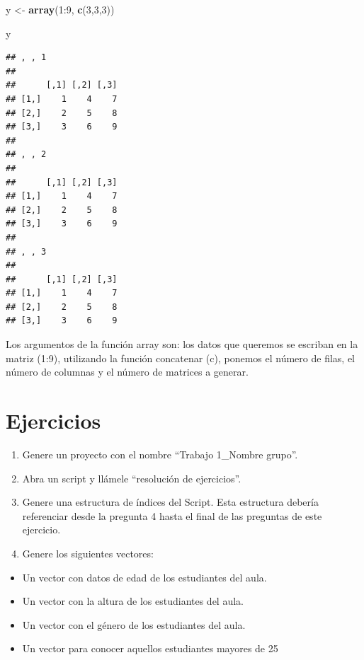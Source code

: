 \documentclass[]{article}
\newenvironment{Shaded}{\begin{snugshade}}{\end{snugshade}}
\newcommand{\KeywordTok}[1]{\textcolor[rgb]{0.13,0.29,0.53}{\textbf{{#1}}}}
\newcommand{\DecValTok}[1]{\textcolor[rgb]{0.00,0.00,0.81}{{#1}}}
\newcommand{\StringTok}[1]{\textcolor[rgb]{0.31,0.60,0.02}{{#1}}}
\newcommand{\NormalTok}[1]{{#1}}
\providecommand{\tightlist}{%
  \setlength{\itemsep}{0pt}\setlength{\parskip}{0pt}}
\begin{document}
\begin{Shaded}
\begin{Highlighting}[]
\NormalTok{y <-}\StringTok{ }\KeywordTok{array}\NormalTok{(}\DecValTok{1}\NormalTok{:}\DecValTok{9}\NormalTok{, }\KeywordTok{c}\NormalTok{(}\DecValTok{3}\NormalTok{,}\DecValTok{3}\NormalTok{,}\DecValTok{3}\NormalTok{))}

\NormalTok{y}
\end{Highlighting}
\end{Shaded}

\begin{verbatim}
## , , 1
## 
##      [,1] [,2] [,3]
## [1,]    1    4    7
## [2,]    2    5    8
## [3,]    3    6    9
## 
## , , 2
## 
##      [,1] [,2] [,3]
## [1,]    1    4    7
## [2,]    2    5    8
## [3,]    3    6    9
## 
## , , 3
## 
##      [,1] [,2] [,3]
## [1,]    1    4    7
## [2,]    2    5    8
## [3,]    3    6    9
\end{verbatim}

Los argumentos de la función array son: los datos que queremos se
escriban en la matriz (1:9), utilizando la función concatenar (c),
ponemos el número de filas, el número de columnas y el número de
matrices a generar.

\section{Ejercicios}\label{ejercicios}

\begin{enumerate}
\def\labelenumi{\arabic{enumi}.}
\item
  Genere un proyecto con el nombre ``Trabajo 1\_Nombre grupo''.
\item
  Abra un script y llámele ``resolución de ejercicios''.
\item
  Genere una estructura de índices del Script. Esta estructura debería
  referenciar desde la pregunta 4 hasta el final de las preguntas de
  este ejercicio.
\item
  Genere los siguientes vectores:
\end{enumerate}

\begin{itemize}
\tightlist
\item
  Un vector con datos de edad de los estudiantes del aula.
\item
  Un vector con la altura de los estudiantes del aula.
\item
  Un vector con el género de los estudiantes del aula.
\item
  Un vector para conocer aquellos estudiantes mayores de 25
\end{itemize}
\end{document}
